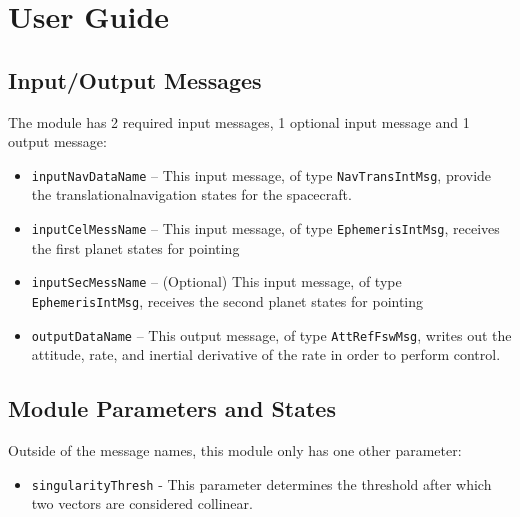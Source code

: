
\section{User Guide}
\subsection{Input/Output Messages}
The module has 2 required input messages, 1 optional input message and 1 output message:
\begin{itemize}
	\item {\tt inputNavDataName} -- This input message, of type {\tt NavTransIntMsg}, provide the translationalnavigation states for the spacecraft.
	\item {\tt inputCelMessName} -- This input message, of type {\tt EphemerisIntMsg}, receives the first planet states for pointing
	\item {\tt inputSecMessName} -- (Optional) This input message, of type {\tt EphemerisIntMsg}, receives the second planet states for pointing
	\item {\tt outputDataName} -- This output message, of type {\tt AttRefFswMsg}, writes out the attitude, rate, and inertial derivative of the rate in order to perform control. 
\end{itemize}

\subsection{Module Parameters and States}
Outside of the message names, this module only has one other parameter:
\begin{itemize}
	\item {\tt singularityThresh} - This parameter determines the threshold after which two vectors are considered collinear. 
\end{itemize}


